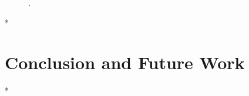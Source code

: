 \documentclass[letterpaper,10pt,conference]{ieeeconf}
\newcommand{\figpath}{./figures}
\theoremstyle{definition}
\begin{document}
\begin{figure}[h]
  \centering
  
  \label{fig:trajectory}
  \caption{.}
\end{figure}

  

*

\section{Conclusion and Future Work}
\label{sec:conclusion}

*


 
\vspace{0.1ex}

\newpage
\end{document}
